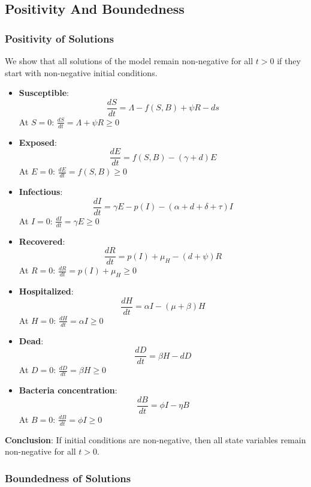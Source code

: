 \documentclass[a4paper,12pt]{report}
\begin{document}
\begin{itemize}
\subsection{Positivity And Boundedness}
\subsubsection{Positivity of Solutions}
We show that all solutions of the model remain non-negative for all $t > 0$ if they start with non-negative initial conditions.

\begin{itemize}
    \item \textbf{Susceptible}:
    \[
    \frac{dS}{dt} = \Lambda - f(S,B) + \psi R-ds
    \]
    At $S=0$: $\frac{dS}{dt} = \Lambda + \psi R \geq 0$

    \item \textbf{Exposed}:
    \[
    \frac{dE}{dt} = f(S,B) - (\gamma + d)E
    \]
    At $E=0$: $\frac{dE}{dt} = f(S,B) \geq 0$

    \item \textbf{Infectious}:
    \[
    \frac{dI}{dt} = \gamma E - p(I) - (\alpha + d + \delta + \tau)I
    \]
    At $I=0$: $\frac{dI}{dt} = \gamma E \geq 0$

    \item \textbf{Recovered}:
    \[
    \frac{dR}{dt} = p(I) + \mu_H - (d + \psi)R
    \]
    At $R=0$: $\frac{dR}{dt} = p(I) + \mu_H \geq 0$

    \item \textbf{Hospitalized}:
    \[
    \frac{dH}{dt} = \alpha I - (\mu + \beta)H
    \]
    At $H=0$: $\frac{dH}{dt} = \alpha I \geq 0$

    \item \textbf{Dead}:
    \[
    \frac{dD}{dt} = \beta H - dD
    \]
    At $D=0$: $\frac{dD}{dt} = \beta H \geq 0$

    \item \textbf{Bacteria concentration}:
    \[
    \frac{dB}{dt} = \phi I - \eta B
    \]
    At $B=0$: $\frac{dB}{dt} = \phi I \geq 0$
\end{itemize}

\textbf{Conclusion}: If initial conditions are non-negative, then all state variables remain non-negative for all $t > 0$.


\subsubsection{Boundedness of Solutions}





\end{itemize}
\end{document}
